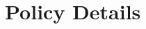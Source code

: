 \documentclass[a4paper,12pt]{article}
\begin{document}








 


\section{Policy Details}
\end{document}
